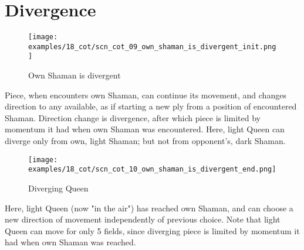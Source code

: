 \clearpage %

\section*{Divergence}
\label{sec:Conquest of Tlalocan/Divergence}

\vspace*{-1.4\baselineskip}
\noindent
\begin{figure}[!h]
\texttt{[image: examples/18\_cot/scn\_cot\_09\_own\_shaman\_is\_divergent\_init.png]}
\vspace*{-1.3\baselineskip}
\caption{Own Shaman is divergent}
\label{fig:scn_cot_09_own_shaman_is_divergent_init}
\end{figure}

\vspace*{-0.5\baselineskip}
Piece, when encounters own Shaman, can continue its movement, and changes direction
to any available, as if starting a new ply from a position of encountered Shaman.
Direction change is divergence, after which piece is limited by momentum it had when
own Shaman was encountered. \newline
\indent
Here, light Queen can diverge only from own, light Shaman; but not from opponent's,
dark Shaman.

\clearpage %

\vspace*{-2.1\baselineskip}
\noindent
\begin{figure}[!h]
\texttt{[image: examples/18\_cot/scn\_cot\_10\_own\_shaman\_is\_divergent\_end.png]}
\vspace*{-1.3\baselineskip}
\caption{Diverging Queen}
\label{fig:scn_cot_10_own_shaman_is_divergent_end}
\end{figure}

\vspace*{-0.4\baselineskip}
Here, light Queen (now "in the air") has reached own Shaman, and can choose a new
direction of movement independently of previous choice. Note that light Queen can
move for only 5 fields, since diverging piece is limited by momentum it had when
own Shaman was reached.

